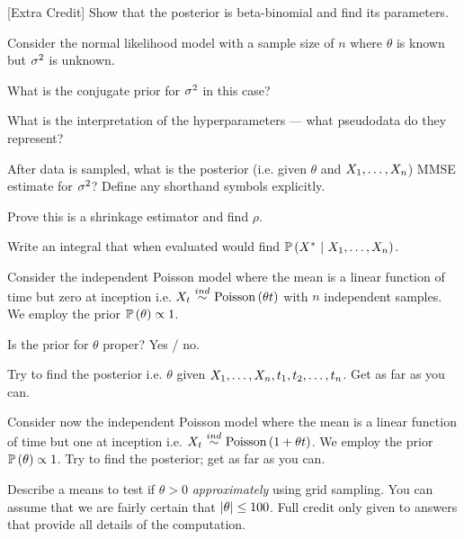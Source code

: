 \documentclass[12pt]{article}
\begin{document}
 [Extra Credit] Show that the posterior is beta-binomial and find its parameters.

\eenum

\problem Consider the normal likelihood model with a sample size of $n$ where $\theta$ is known but $\sigma^2$ is unknown.

\benum

 What is the conjugate prior for $\sigma^2$ in this case?

 What is the interpretation of the hyperparameters --- what pseudodata do they represent?

 After data is sampled, what is the posterior (i.e. given $\theta$ and $X_1, \ldots, X_n$) MMSE estimate for $\sigma^2$? Define any shorthand symbols explicitly.

 Prove this is a shrinkage estimator and find $\rho$.

 Write an integral that when evaluated would find $\mathbb{P}\left(X^*~|~X_1, \ldots, X_n\right)$.

\eenum

\problem Consider the independent Poisson model where the mean is a linear function of time but zero at inception i.e. $X_t \inddist \poisson{\theta t}$ with $n$ independent samples. We employ the prior $\mathbb{P}\left(\theta\right) \propto 1$.

\benum

 Is the prior for $\theta$ proper? Yes / no.


 Try to find the posterior i.e. $\theta$ given $X_1, \ldots, X_n, t_1, t_2, \ldots, t_n$. Get as far as you can.


 Consider now the independent Poisson model where the mean is a linear function of time but one at inception i.e. $X_t \inddist \poisson{1 + \theta t}$. We employ the prior $\mathbb{P}\left(\theta\right) \propto 1$. Try to find the posterior; get as far as you can.


 Describe a means to test if $\theta > 0$ \emph{approximately} using grid sampling. You can assume that we are fairly certain that $\left|\theta\right| \leq 100$. Full credit only given to answers that provide all details of the computation.
\end{document}
